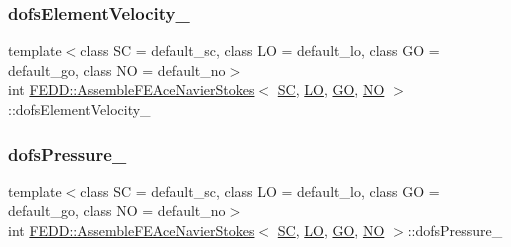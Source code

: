 \mbox{\label{classFEDD_1_1AssembleFEAceNavierStokes_a5a962e0f07c7887831259dcce56b107c}} 
\subsubsection{\texorpdfstring{dofs\+Element\+Velocity\+\_\+}{dofsElementVelocity\_}}
{\footnotesize\ttfamily template$<$class SC  = default\+\_\+sc, class LO  = default\+\_\+lo, class GO  = default\+\_\+go, class NO  = default\+\_\+no$>$ \\
int \hyperlink{classFEDD_1_1AssembleFEAceNavierStokes}{F\+E\+D\+D\+::\+Assemble\+F\+E\+Ace\+Navier\+Stokes}$<$ \hyperlink{fe__test__laplace_8cpp_a79c7e86a57edbb2a5a53242bcd04e41e}{SC}, \hyperlink{fe__test__laplace_8cpp_ad6a38c9f07d3fd633eefca5bccad8410}{LO}, \hyperlink{fe__test__laplace_8cpp_afa2946b509009b4f45eb04bd8c5b27d9}{GO}, \hyperlink{fe__test__laplace_8cpp_a5e24f37b28787429872b6ecb1d0417ce}{NO} $>$\+::dofs\+Element\+Velocity\+\_\+\hspace{0.3cm}{\ttfamily [private]}}

\mbox{\label{classFEDD_1_1AssembleFEAceNavierStokes_abf1541abe26336013363cacacb149443}} 
\subsubsection{\texorpdfstring{dofs\+Pressure\+\_\+}{dofsPressure\_}}
{\footnotesize\ttfamily template$<$class SC  = default\+\_\+sc, class LO  = default\+\_\+lo, class GO  = default\+\_\+go, class NO  = default\+\_\+no$>$ \\
int \hyperlink{classFEDD_1_1AssembleFEAceNavierStokes}{F\+E\+D\+D\+::\+Assemble\+F\+E\+Ace\+Navier\+Stokes}$<$ \hyperlink{fe__test__laplace_8cpp_a79c7e86a57edbb2a5a53242bcd04e41e}{SC}, \hyperlink{fe__test__laplace_8cpp_ad6a38c9f07d3fd633eefca5bccad8410}{LO}, \hyperlink{fe__test__laplace_8cpp_afa2946b509009b4f45eb04bd8c5b27d9}{GO}, \hyperlink{fe__test__laplace_8cpp_a5e24f37b28787429872b6ecb1d0417ce}{NO} $>$\+::dofs\+Pressure\+\_\+\hspace{0.3cm}{\ttfamily [private]}}

